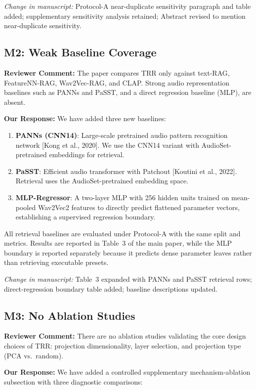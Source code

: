 \documentclass[11pt]{article}
\newcommand{\reviewer}[1]{\textcolor{reviewercolor}{\textbf{Reviewer Comment:} #1}}
\newcommand{\response}[1]{\textcolor{responsecolor}{\textbf{Our Response:} #1}}
\newcommand{\change}[1]{\textit{Change in manuscript:} #1}
\begin{document}
\change{Protocol-A near-duplicate sensitivity paragraph and table added; supplementary sensitivity analysis retained; Abstract revised to mention near-duplicate sensitivity.}

\subsection*{M2: Weak Baseline Coverage}

\reviewer{The paper compares TRR only against text-RAG, FeatureNN-RAG, Wav2Vec-RAG, and CLAP. Strong audio representation baselines such as PANNs and PaSST, and a direct regression baseline (MLP), are absent.}

\response{We have added three new baselines:}

\begin{enumerate}[leftmargin=*]
\item \textbf{PANNs (CNN14)}: Large-scale pretrained audio pattern recognition network [Kong et al., 2020]. We use the CNN14 variant with AudioSet-pretrained embeddings for retrieval.
\item \textbf{PaSST}: Efficient audio transformer with Patchout [Koutini et al., 2022]. Retrieval uses the AudioSet-pretrained embedding space.
\item \textbf{MLP-Regressor}: A two-layer MLP with 256 hidden units trained on mean-pooled Wav2Vec2 features to directly predict flattened parameter vectors, establishing a supervised regression boundary.
\end{enumerate}

All retrieval baselines are evaluated under Protocol-A with the same split and metrics. Results are reported in Table~3 of the main paper, while the MLP boundary is reported separately because it predicts dense parameter leaves rather than retrieving executable presets.

\change{Table~3 expanded with PANNs and PaSST retrieval rows; direct-regression boundary table added; baseline descriptions updated.}

\subsection*{M3: No Ablation Studies}

\reviewer{There are no ablation studies validating the core design choices of TRR: projection dimensionality, layer selection, and projection type (PCA vs.\ random).}

\response{We have added a controlled supplementary mechanism-ablation subsection with three diagnostic comparisons:}
\end{document}
